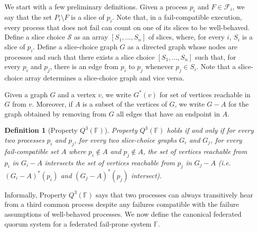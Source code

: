 \documentclass[11pt,letterpaper]{article}
\newtheorem{definition}{Definition}
\begin{document}
We start with a few preliminary definitions.
Given a process $p_i$ and $F\in \mathcal{F}_i$, we say that the set $P_i\setminus F$ is a slice of $p_i$.
Note that, in a fail-compatible execution, every process that does not fail can count on one of its slices to be well-behaved.
Define a slice choice $\mathcal{S}$ as an array $\left[S_1,...,S_n\right]$ of slices, where, for every $i$, $S_i$ is a slice of $p_i$.
Define a slice-choice graph $G$ as a directed graph whose nodes are processes and such that there exists a slice choice $\left[S_1,...,S_n\right]$ such that, for every $p_i$ and $p_j$, there is an edge from $p_i$ to $p_j$ whenever $p_j\in S_i$. Note that a slice-choice array determines a slice-choice graph and vice versa.

Given a graph $G$ and a vertex $v$, we write $G^*(v)$ for set of vertices reachable in $G$ from $v$. Moreover, if $A$ is a subset of the vertices of $G$, we write $G-A$ for the graph obtained by removing from $G$ all edges that have an endpoint in $A$.



\begin{definition}[Property $Q^3(\mathbb{F})$]
  Property $Q^3(\mathbb{F})$ holds if and only if for every two processes $p_i$ and $p_j$, for every two slice-choice graphs $G_i$ and $G_j$, for every fail-compatible set $A$ where $p_i\not\in A$ and $p_j\not\in A$, the set of vertices reachable from $p_i$ in $G_i-A$ intersects the set of vertices reachable from $p_j$ in $G_j-A$ (i.e.\ $\left(G_i-A\right)^*(p_i)$ and $\left(G_j-A\right)^*(p_j)$ intersect).
\end{definition}

Informally, Property $Q^3(\mathbb{F})$ says that two processes can always transitively hear from a third common process despite any failures compatible with the failure assumptions of well-behaved processes.
We now define the canonical federated quorum system for a federated fail-prone system $\mathbb{F}$.
\end{document}
